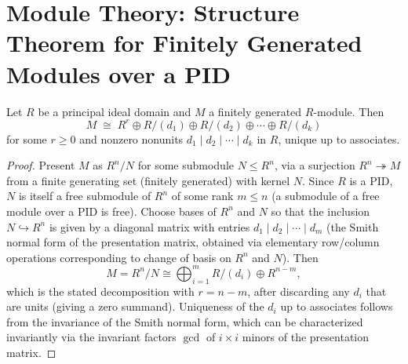 \section{Module Theory: Structure Theorem for Finitely Generated Modules over a PID}

\begin{theorem}
Let $R$ be a principal ideal domain and $M$ a finitely generated
$R$-module. Then
\[
M \;\cong\; R^r \oplus R/(d_1) \oplus R/(d_2) \oplus \cdots \oplus R/(d_k)
\]
for some $r \geq 0$ and nonzero nonunits $d_1 \mid d_2 \mid \cdots \mid d_k$
in $R$, unique up to associates.
\end{theorem}

\begin{proof}
Present $M$ as $R^n / N$ for some submodule $N \leq R^n$, via a surjection
$R^n \twoheadrightarrow M$ from a finite generating set (finitely generated)
with kernel $N$. Since $R$ is a PID, $N$ is itself a free submodule of
$R^n$ of some rank $m \leq n$ (a submodule of a free module over a PID is
free). Choose bases of $R^n$ and $N$ so that the inclusion $N \hookrightarrow R^n$
is given by a diagonal matrix with entries $d_1 \mid d_2 \mid \cdots \mid d_m$
(the Smith normal form of the presentation matrix, obtained via elementary
row/column operations corresponding to change of basis on $R^n$ and $N$).
Then
\[
M = R^n / N \cong \bigoplus_{i=1}^m R/(d_i) \oplus R^{n-m},
\]
which is the stated decomposition with $r = n - m$, after discarding any
$d_i$ that are units (giving a zero summand). Uniqueness of the $d_i$ up to
associates follows from the invariance of the Smith normal form, which can
be characterized invariantly via the invariant factors
$\gcd$ of $i \times i$ minors of the presentation matrix.
\end{proof}
